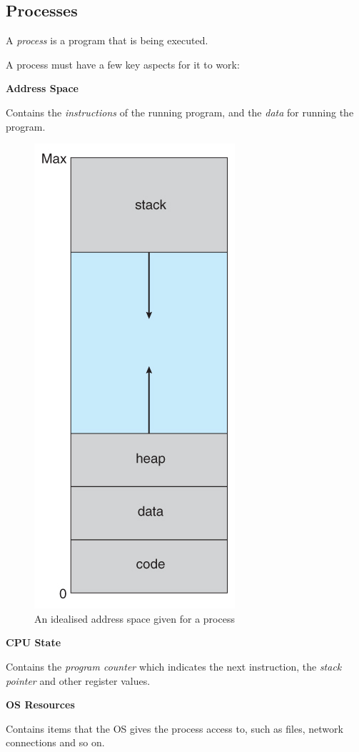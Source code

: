 \documentclass[a4]{article}
\begin{document}
\filbreak
\subsection{Processes}

A \textit{process} is a program that is being executed.

A process must have a few key aspects for it to work:

\begin{framed}
  \textbf{Address Space}

  Contains the \textit{instructions} of the running program, and the \textit{data} for running the program.

  \begin{figure}[H]
    \centering
    \includegraphics[scale=0.64]{addressspace}
    \caption{An idealised address space given for a process}
  \end{figure}

  \textbf{CPU State}

  Contains the \textit{program counter} which indicates the next instruction, the \textit{stack pointer} and other register values.

  \textbf{OS Resources}

  Contains items that the OS gives the process access to, such as files, network connections and so on.
\end{framed}
\end{document}
